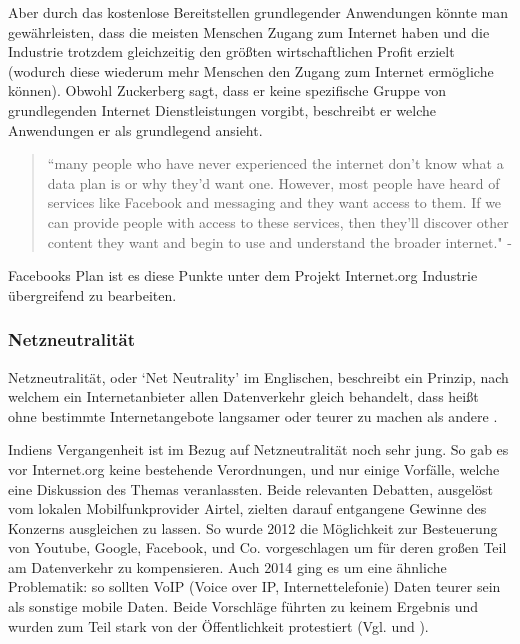\documentclass{article}
\begin{document}
Aber durch das kostenlose Bereitstellen grundlegender Anwendungen könnte man gewährleisten, dass die meisten Menschen Zugang zum Internet haben und die Industrie trotzdem gleichzeitig den größten wirtschaftlichen Profit erzielt (wodurch diese wiederum mehr Menschen den Zugang zum Internet ermögliche können).
Obwohl Zuckerberg sagt, dass er keine spezifische Gruppe von grundlegenden Internet Dienstleistungen vorgibt, beschreibt er welche Anwendungen er als grundlegend ansieht.

\begin{quote}
``many people who have never experienced the internet don’t know what a data plan is or why they’d want one. 
However, most people have heard of services like Facebook and messaging and they want access to them. If we can provide people 
with access to these services, then they’ll discover other content they want and begin to use 
and understand the broader internet." - \textcite[4]{HumanRight}
\end{quote}

Facebooks Plan ist es diese Punkte unter dem Projekt Internet.org Industrie übergreifend zu bearbeiten.

\subsubsection{Netzneutralität}

Netzneutralität, oder `Net Neutrality' im Englischen, beschreibt ein Prinzip, nach welchem ein Internetanbieter allen Datenverkehr gleich behandelt, dass heißt ohne bestimmte Internetangebote langsamer oder teurer zu machen als andere \autocite{netzneutralität}.

\medskip

Indiens Vergangenheit ist im Bezug auf Netzneutralität noch sehr jung. So gab es vor Internet.org keine bestehende Verordnungen, und nur einige Vorfälle, welche eine Diskussion des Themas veranlassten.
Beide relevanten Debatten, ausgelöst vom lokalen Mobilfunkprovider Airtel, zielten darauf entgangene Gewinne des Konzerns ausgleichen zu lassen.
So wurde 2012 die Möglichkeit zur Besteuerung von Youtube, Google, Facebook, und Co. vorgeschlagen um für deren großen Teil am Datenverkehr zu kompensieren.
Auch 2014 ging es um eine ähnliche Problematik: so sollten VoIP (Voice over IP, Internettelefonie) Daten teurer sein als sonstige mobile Daten.
Beide Vorschläge führten zu keinem Ergebnis und wurden zum Teil stark von der Öffentlichkeit protestiert (Vgl. \textcite[253]{everydayLife} und \textcite{airtelVoip}).
\end{document}
